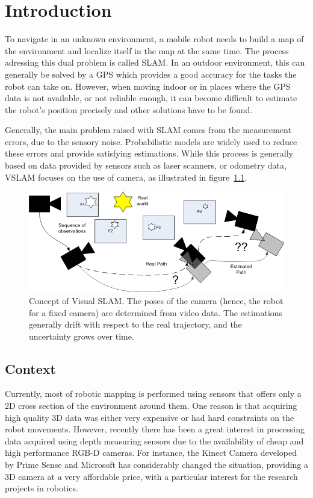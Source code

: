 \chapter{Introduction}

To navigate in an unknown environment, a mobile robot needs to build a map of the environment and localize itself in the map at the same time. The process adressing this dual problem is called \gls{SLAM}. In an outdoor environment, this can generally be solved by a GPS which provides a good accuracy for the tasks the robot can take on. However, when moving indoor or in places where the GPS data is not available, or not reliable enough, it can become difficult to estimate the robot's position precisely and other solutions have to be found. 

Generally, the main problem raised with \gls{SLAM} comes from the measurement errors, due to the sensory noise. Probabilistic models are widely used to reduce these errors and provide satisfying estimations. While this process is generally based on data provided by sensors such as laser scanners, or odometry data, \gls{VSLAM} focuses on the use of camera, as illustrated in figure~\ref{fig:vslam_overview}.

\begin{figure}[h!]
\centering
\includegraphics[width=1.0\textwidth]{figures/visual_slam}
\caption{Concept of Visual SLAM. The poses of the camera (hence, the robot for a fixed camera) are determined from video data. The estimations generally drift with respect to the real trajectory, and the uncertainty grows over time.}
\label{fig:vslam_overview}
\end{figure}

\section{Context}

Currently, most of robotic mapping is performed using sensors that offers only a 2D cross section of the environment around them. One reason is that acquiring high quality 3D data was either very expensive or had hard constraints on the robot movements. However, recently there has been a great interest in processing data acquired using depth measuring sensors due to the availability of cheap and high performance RGB-D cameras. For instance, the Kinect Camera developed by Prime Sense and Microsoft has considerably changed the situation, providing a 3D camera at a very affordable price, with a particular interest for the research projects in robotics.

